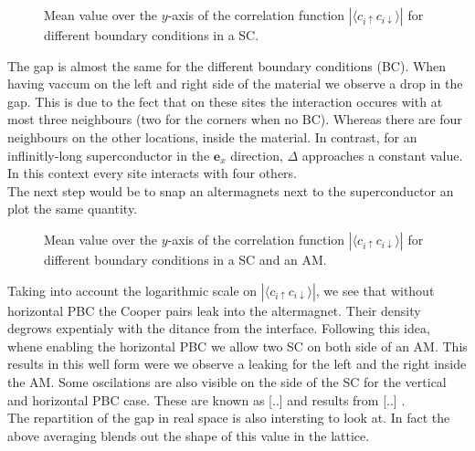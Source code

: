 \documentclass[../main.tex]{subfile}
\begin{document}
\begin{figure}[H]
    \centering
    
    \caption{Mean value over the $y$-axis of the correlation function $|\langle c_{i\uparrow} c_{i\downarrow}\rangle|$ for different
     boundary conditions in a SC. }
\end{figure} 
The gap is almost the same for the different boundary conditions (BC). When having vaccum on the left and right side of the 
material we observe a drop in the gap. This is due to the fect that on these sites the interaction occures with at most three
neighbours (two for the corners when no BC). Whereas there are four neighbours on the other locations, inside the material.
In contrast, for an inflinitly-long superconductor in the $\bm{e}_x$
direction, $\Delta$ approaches a constant value. In this context every site interacts with four others. \\

The next step would be to snap an altermagnets next to the superconductor an plot the same quantity.
\begin{figure}[H]
    \centering
    
    \caption{Mean value over the $y$-axis of the correlation function $|\langle c_{i\uparrow} c_{i\downarrow}\rangle|$ for different
     boundary conditions in a SC and an AM.}
\end{figure} 
Taking into account the logarithmic scale on $|\langle c_{i\uparrow} c_{i\downarrow}\rangle|$, we see that without horizontal
PBC the Cooper pairs leak into the altermagnet. Their density degrows expentialy with the ditance from the interface. Following
this idea, whene enabling the horizontal PBC we allow two SC on both side of an AM. This results in this well form were we observe
a leaking for the left and the right inside the AM. Some oscilations are also visible on the side of the SC for the vertical and 
horizontal PBC case. These are known as [..] and results from [..] .\\

The repartition of the gap in real space is also intersting to look at. In fact the above averaging blends out the shape 
of this value in the lattice.
\end{document}
